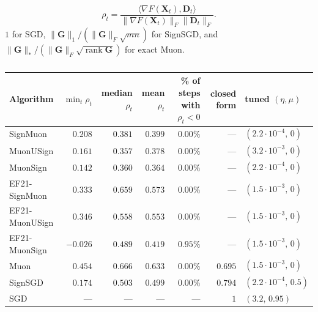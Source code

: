 \paragraph{}
\begin{equation}
\rho_t=\frac{\langle\nabla F(\mathbf X_t),\mathbf D_t\rangle}
{\|\nabla F(\mathbf X_t)\|_F\|\mathbf D_t\|_F}.
\label{eq:alignment}
\end{equation}
 $1$ for SGD, $\|\mathbf G\|_1/(\|\mathbf G\|_F\sqrt{mn})$ for SignSGD, and $\|\mathbf G\|_* /(\|\mathbf G\|_F\sqrt{\operatorname{rank}\mathbf G})$ for exact Muon. 


\begin{table}[!t]
\centering
\small
\begin{tabular}{@{}lrrrrrl@{}}
\toprule
\textbf{Algorithm} & \textbf{$\min_t \rho_t$} & \textbf{median $\rho_t$} & \textbf{mean $\rho_t$} & \textbf{\% of steps with $\rho_t<0$} & \textbf{closed form} & \textbf{tuned $(\eta,\mu)$} \\
\midrule
SignMuon        & $0.208$  & $0.381$ & $0.399$ & $0.00\%$ & ---      & $(2.2\cdot10^{-4},\, 0)$ \\
MuonUSign       & $0.161$  & $0.357$ & $0.378$ & $0.00\%$ & ---      & $(3.2\cdot10^{-3},\, 0)$ \\
MuonSign        & $0.142$  & $0.360$ & $0.364$ & $0.00\%$ & ---      & $(2.2\cdot10^{-4},\, 0)$ \\
EF21-SignMuon   & $0.333$  & $0.659$ & $0.573$ & $0.00\%$ & ---      & $(1.5\cdot10^{-3},\, 0)$ \\
EF21-MuonUSign  & $0.346$  & $0.558$ & $0.553$ & $0.00\%$ & ---      & $(1.5\cdot10^{-3},\, 0)$ \\
EF21-MuonSign   & $-0.026$ & $0.489$ & $0.419$ & $0.95\%$ & ---      & $(1.5\cdot10^{-3},\, 0)$ \\
Muon            & $0.454$  & $0.666$ & $0.633$ & $0.00\%$ & $0.695$  & $(1.5\cdot10^{-3},\, 0)$ \\
SignSGD         & $0.174$  & $0.503$ & $0.499$ & $0.00\%$ & $0.794$  & $(2.2\cdot10^{-4},\, 0.5)$ \\
SGD             & ---      & ---     & ---     & ---      & $1$      & $(3.2,\, 0.95)$ \\
\bottomrule
\end{tabular}
\caption{}
\label{tab:synthetic_alignment}
\end{table}

